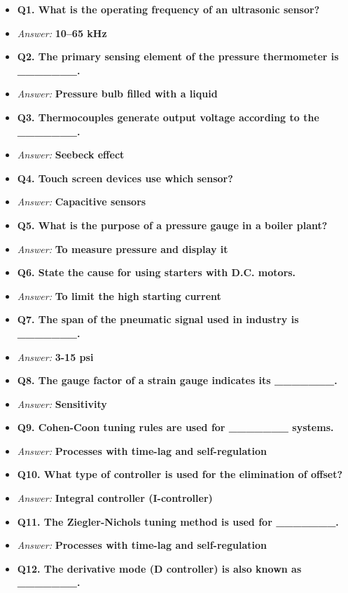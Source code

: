 \begin{itemize}
  \item \textbf{Q1. What is the operating frequency of an ultrasonic sensor?}
  \item \textit{Answer:} \textbf{10–65 kHz}
  \item \textbf{Q2. The primary sensing element of the pressure thermometer is \_\_\_\_\_\_\_.}
  \item \textit{Answer:} \textbf{Pressure bulb filled with a liquid}
  \item \textbf{Q3. Thermocouples generate output voltage according to the \_\_\_\_\_\_\_.}
  \item \textit{Answer:} \textbf{Seebeck effect}
  \item \textbf{Q4. Touch screen devices use which sensor?}
  \item \textit{Answer:} \textbf{Capacitive sensors}
  \item \textbf{Q5. What is the purpose of a pressure gauge in a boiler plant?}
  \item \textit{Answer:} \textbf{To measure pressure and display it}
  \item \textbf{Q6. State the cause for using starters with D.C. motors.}
  \item \textit{Answer:} \textbf{To limit the high starting current}
  \item \textbf{Q7. The span of the pneumatic signal used in industry is \_\_\_\_\_\_\_.}
  \item \textit{Answer:} \textbf{3-15 psi}
  \item \textbf{Q8. The gauge factor of a strain gauge indicates its \_\_\_\_\_\_\_.}
  \item \textit{Answer:} \textbf{Sensitivity}
  \item \textbf{Q9. Cohen-Coon tuning rules are used for \_\_\_\_\_\_\_ systems.}
  \item \textit{Answer:} \textbf{Processes with time-lag and self-regulation}
  \item \textbf{Q10. What type of controller is used for the elimination of offset?}
  \item \textit{Answer:} \textbf{Integral controller (I-controller)}
  \item \textbf{Q11. The Ziegler-Nichols tuning method is used for \_\_\_\_\_\_\_.}
  \item \textit{Answer:} \textbf{Processes with time-lag and self-regulation}
  \item \textbf{Q12. The derivative mode (D controller) is also known as \_\_\_\_\_\_\_.}

\end{itemize}
